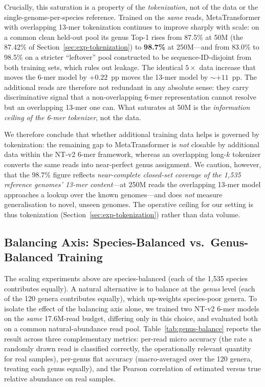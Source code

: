 Crucially, this saturation is a property of the \emph{tokenization}, not of the data or the single-genome-per-species reference. Trained on the \emph{same} reads, MetaTransformer with overlapping 13-mer tokenization continues to improve sharply with scale: on a common clean held-out pool its genus Top-1 rises from 87.5\% at 50M (the 87.42\% of Section~\ref{sec:exp-tokenization}) to \textbf{98.7\%} at 250M---and from 83.0\% to 98.5\% on a stricter ``leftover'' pool constructed to be sequence-ID-disjoint from both training sets, which rules out leakage. The identical $5\times$ data increase that moves the 6-mer model by $+0.22$~pp moves the 13-mer model by ${\sim}+11$~pp. The additional reads are therefore not redundant in any absolute sense: they carry discriminative signal that a non-overlapping 6-mer representation cannot resolve but an overlapping 13-mer one can. What saturates at 50M is the \emph{information ceiling of the 6-mer tokenizer}, not the data.

We therefore conclude that whether additional training data helps is governed by tokenization: the remaining gap to MetaTransformer is \emph{not} closable by additional data within the NT-v2 6-mer framework, whereas an overlapping long-$k$ tokenizer converts the same reads into near-perfect genus assignment. We caution, however, that the 98.7\% figure reflects \emph{near-complete closed-set coverage of the 1{,}535 reference genomes' 13-mer content}---at 250M reads the overlapping 13-mer model approaches a lookup over the known genomes---and does \emph{not} measure generalisation to novel, unseen genomes. The operative ceiling for our setting is thus tokenization (Section~\ref{sec:exp-tokenization}) rather than data volume.

\subsection{Balancing Axis: Species-Balanced vs.\ Genus-Balanced Training}
\label{sec:exp-genus-balance}

The scaling experiments above are species-balanced (each of the 1{,}535 species contributes equally). A natural alternative is to balance at the \emph{genus} level (each of the 120 genera contributes equally), which up-weights species-poor genera. To isolate the effect of the balancing axis alone, we trained two NT-v2 6-mer models on the \emph{same} 17.6M-read budget, differing only in this choice, and evaluated both on a common natural-abundance read pool. Table~\ref{tab:genus-balance} reports the result across three complementary metrics: per-read micro accuracy (the rate a randomly drawn read is classified correctly, the operationally relevant quantity for real samples), per-genus flat accuracy (macro-averaged over the 120 genera, treating each genus equally), and the Pearson correlation of estimated versus true relative abundance on real samples.

